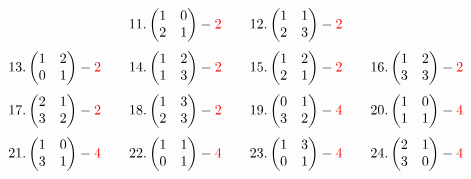 \documentclass[11pt, fleqn]{article}
\begin{document}
\begin{sol}
\[        11.\begin{pmatrix}
            1 & 0\\
            2 & 1
        \end{pmatrix} - \textcolor{red}{2} \qquad
        12.\begin{pmatrix}
            1 & 1\\
            2 & 3
        \end{pmatrix} - \textcolor{red}{2}\]
        \[13.\begin{pmatrix}
            1 & 2\\
            0 & 1
        \end{pmatrix} - \textcolor{red}{2} \qquad
        14.\begin{pmatrix}
            1 & 2\\
            1 & 3
        \end{pmatrix} - \textcolor{red}{2} \qquad
        15.\begin{pmatrix}
            1 & 2\\
            2 & 1
        \end{pmatrix} - \textcolor{red}{2} \qquad
        16.\begin{pmatrix}
            1 & 2\\
            3 & 3
        \end{pmatrix} - \textcolor{red}{2}\]
        \[17.\begin{pmatrix}
            2 & 1\\
            3 & 2
        \end{pmatrix} - \textcolor{red}{2} \qquad
        18.\begin{pmatrix}
            1 & 3\\
            2 & 3
        \end{pmatrix} - \textcolor{red}{2} \qquad
        19.\begin{pmatrix}
            0 & 1\\
            3 & 2
        \end{pmatrix} - \textcolor{red}{4} \qquad
        20.\begin{pmatrix}
            1 & 0\\
            1 & 1
        \end{pmatrix} - \textcolor{red}{4}\]
        \[21.\begin{pmatrix}
            1 & 0\\
            3 & 1
        \end{pmatrix} - \textcolor{red}{4} \qquad
        22.\begin{pmatrix}
            1 & 1\\
            0 & 1
        \end{pmatrix} - \textcolor{red}{4} \qquad
        23.\begin{pmatrix}
            1 & 3\\
            0 & 1
        \end{pmatrix} - \textcolor{red}{4} \qquad
        24.\begin{pmatrix}
            2 & 1\\
            3 & 0
        \end{pmatrix} - \textcolor{red}{4}\]
    \end{sol}
\end{document}
